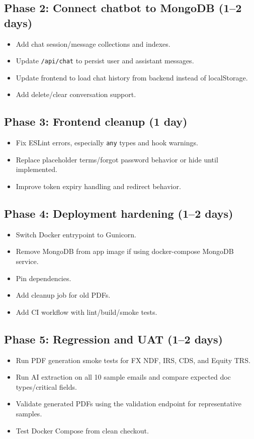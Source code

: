 \documentclass[11pt]{article}
\begin{document}
\subsection{Phase 2: Connect chatbot to MongoDB (1--2 days)}
\begin{itemize}
  \item Add chat session/message collections and indexes.
  \item Update \texttt{/api/chat} to persist user and assistant messages.
  \item Update frontend to load chat history from backend instead of localStorage.
  \item Add delete/clear conversation support.
\end{itemize}

\subsection{Phase 3: Frontend cleanup (1 day)}
\begin{itemize}
  \item Fix ESLint errors, especially \texttt{any} types and hook warnings.
  \item Replace placeholder terms/forgot password behavior or hide until implemented.
  \item Improve token expiry handling and redirect behavior.
\end{itemize}

\subsection{Phase 4: Deployment hardening (1--2 days)}
\begin{itemize}
  \item Switch Docker entrypoint to Gunicorn.
  \item Remove MongoDB from app image if using docker-compose MongoDB service.
  \item Pin dependencies.
  \item Add cleanup job for old PDFs.
  \item Add CI workflow with lint/build/smoke tests.
\end{itemize}

\subsection{Phase 5: Regression and UAT (1--2 days)}
\begin{itemize}
  \item Run PDF generation smoke tests for FX NDF, IRS, CDS, and Equity TRS.
  \item Run AI extraction on all 10 sample emails and compare expected doc types/critical fields.
  \item Validate generated PDFs using the validation endpoint for representative samples.
  \item Test Docker Compose from clean checkout.
\end{itemize}
\end{document}
